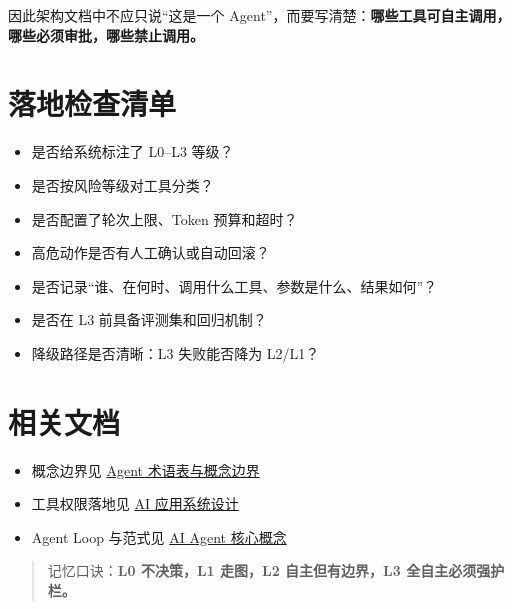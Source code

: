 \documentclass[9pt,a4paper,twocolumn]{ctexart}
\begin{document}
因此架构文档中不应只说“这是一个 Agent”，而要写清楚：\textbf{哪些工具可自主调用，哪些必须审批，哪些禁止调用。}



\section*{落地检查清单}

\begin{itemize}[itemsep=1pt, topsep=2pt]
  \item [ ] 是否给系统标注了 L0–L3 等级？
  \item [ ] 是否按风险等级对工具分类？
  \item [ ] 是否配置了轮次上限、Token 预算和超时？
  \item [ ] 高危动作是否有人工确认或自动回滚？
  \item [ ] 是否记录“谁、在何时、调用什么工具、参数是什么、结果如何”？
  \item [ ] 是否在 L3 前具备评测集和回归机制？
  \item [ ] 降级路径是否清晰：L3 失败能否降为 L2/L1？
\end{itemize}


\section*{相关文档}

\begin{itemize}[itemsep=1pt, topsep=2pt]
  \item 概念边界见 \href{01-Agent术语表与概念边界.md}{Agent 术语表与概念边界}
  \item 工具权限落地见 \href{../07-系统设计/01-AI应用系统设计.md}{AI 应用系统设计}
  \item Agent Loop 与范式见 \href{../02-Agent/01-Agent核心概念.md}{AI Agent 核心概念}
\end{itemize}


\begin{quote}
记忆口诀：\textbf{L0 不决策，L1 走图，L2 自主但有边界，L3 全自主必须强护栏。}
\end{quote}
\end{document}
